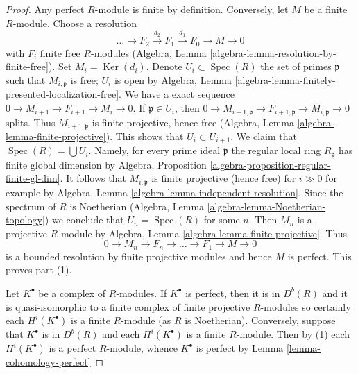 \documentclass[10pt,a4paper]{amsart}
\theoremstyle{plain}
\theoremstyle{definition}
\theoremstyle{remark}
\numberwithin{equation}{subsection}
\def\Spec{\mathop{\mathrm{Spec}}}
\def\Ker{\mathop{\mathrm{Ker}}}
\begin{document}
\begin{proof}
Any perfect $R$-module is finite by definition. Conversely, let $M$ be
a finite $R$-module. Choose a resolution
$$
\ldots \to F_2 \xrightarrow{d_2} F_1 \xrightarrow{d_1} F_0 \to M \to 0
$$
with $F_i$ finite free $R$-modules
(Algebra, Lemma \ref{algebra-lemma-resolution-by-finite-free}).
Set $M_i = \Ker(d_i)$. Denote $U_i \subset \Spec(R)$ the set of primes
$\mathfrak p$ such that $M_{i, \mathfrak p}$ is free; $U_i$ is open by
Algebra, Lemma \ref{algebra-lemma-finitely-presented-localization-free}.
We have a exact sequence $0 \to M_{i + 1} \to F_{i + 1} \to M_i \to 0$.
If $\mathfrak p \in U_i$, then
$0 \to M_{i + 1, \mathfrak p} \to F_{i + 1, \mathfrak p} \to
M_{i, \mathfrak p} \to 0$ splits. Thus $M_{i + 1, \mathfrak p}$
is finite projective, hence free 
(Algebra, Lemma \ref{algebra-lemma-finite-projective}).
This shows that $U_i \subset U_{i + 1}$.
We claim that $\Spec(R) = \bigcup U_i$. Namely, for every prime ideal
$\mathfrak p$ the regular local ring $R_\mathfrak p$ has finite
global dimension by
Algebra, Proposition \ref{algebra-proposition-regular-finite-gl-dim}.
It follows that $M_{i, \mathfrak p}$ is finite projective
(hence free) for
$i \gg 0$ for example by Algebra, Lemma
\ref{algebra-lemma-independent-resolution}.
Since the spectrum of $R$ is Noetherian
(Algebra, Lemma \ref{algebra-lemma-Noetherian-topology})
we conclude that $U_n = \Spec(R)$
for some $n$. Then $M_n$ is a projective $R$-module by
Algebra, Lemma \ref{algebra-lemma-finite-projective}.
Thus
$$
0 \to M_n \to F_n \to \ldots \to F_1 \to M \to 0
$$
is a bounded resolution by finite projective modules
and hence $M$ is perfect.
This proves part (1).

\medskip\noindent
Let $K^\bullet$ be a complex of $R$-modules.
If $K^\bullet$ is perfect, then it is in $D^b(R)$ and it is
quasi-isomorphic to a finite complex of finite projective $R$-modules
so certainly each $H^i(K^\bullet)$ is a finite $R$-module (as $R$ is
Noetherian). Conversely, suppose that $K^\bullet$ is in $D^b(R)$
and each $H^i(K^\bullet)$ is a finite $R$-module. Then by (1) each
$H^i(K^\bullet)$ is a perfect $R$-module, whence $K^\bullet$ is
perfect by
Lemma \ref{lemma-cohomology-perfect}
\end{proof}
\end{document}

